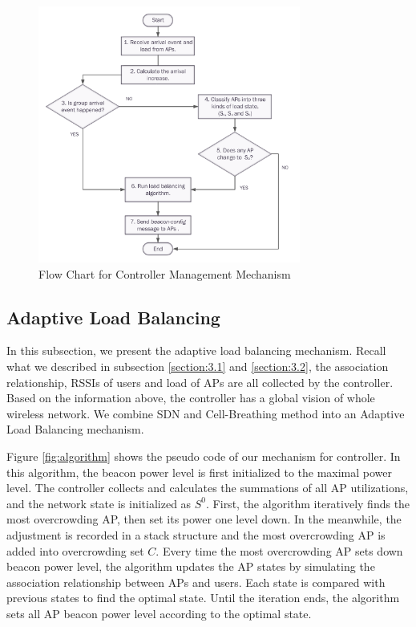 \begin{figure}[tbp]
\begin{center}
\includegraphics[width=3.4in]{images/flowdiagram_trendindicator_controller.pdf}
\end{center}
\caption{ Flow Chart for Controller Management Mechanism}
\label{fig:flowdiagram_trendindicator_controller}
\end{figure}

\subsection{Adaptive Load Balancing}
In this subsection, we present the adaptive load balancing mechanism. Recall what we described in subsection \ref{section:3.1} and \ref{section:3.2}, the association relationship, RSSIs of users and load of APs are all collected by the controller. Based on the information above, the controller has a global vision of whole wireless network. We combine SDN and Cell-Breathing method into an Adaptive Load Balancing mechanism.

 Figure \ref{fig:algorithm} shows the pseudo code of our mechanism for controller. In this algorithm, the beacon power level is first initialized to the maximal power level. The controller collects and calculates the summations of all AP utilizations, and the network state is initialized as $S^0$. First, the algorithm iteratively finds the most overcrowding AP, then set its power one level down. In the meanwhile, the adjustment is recorded in a stack structure and the most overcrowding AP is added into overcrowding set $C$. Every time the most overcrowding AP sets down beacon power level, the algorithm updates the AP states by simulating the association relationship between APs and users. Each state is compared with previous states to find the optimal state. Until the iteration ends, the algorithm sets all AP beacon power level according to the optimal state.

